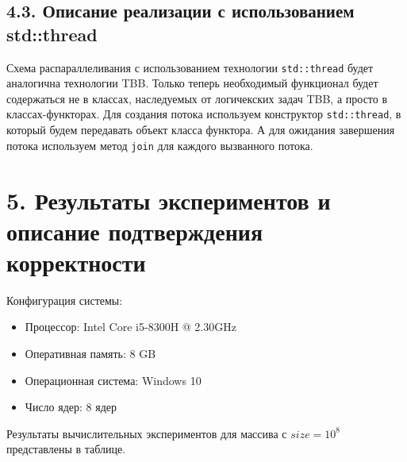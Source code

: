\documentclass{report}
\begin{document}
\subsection*{4.3. Описание реализации с использованием std::thread}
\par Схема распараллеливания с использованием технологии \verb|std::thread| будет аналогична технологии TBB. Только теперь необходимый функционал будет содержаться не в классах, наследуемых от логичекских задач TBB, а просто в классах-функторах. Для создания потока используем конструктор \verb|std::thread|, в который будем передавать объект класса функтора. А для ожидания завершения потока используем метод \verb|join| для каждого вызванного потока.


\newpage
\section*{5. Результаты экспериментов и описание подтверждения корректности}
\par Конфигурация системы:
\begin{itemize}
\item Процессор: Intel Core i5-8300H @ 2.30GHz
\item Оперативная память: 8 GB
\item Операционная система: Windows 10
\item Число ядер: 8 ядер
\end{itemize}
\par Результаты вычислительных экспериментов для массива с $size = 10^8$ представлены в таблице.
\end{document}
